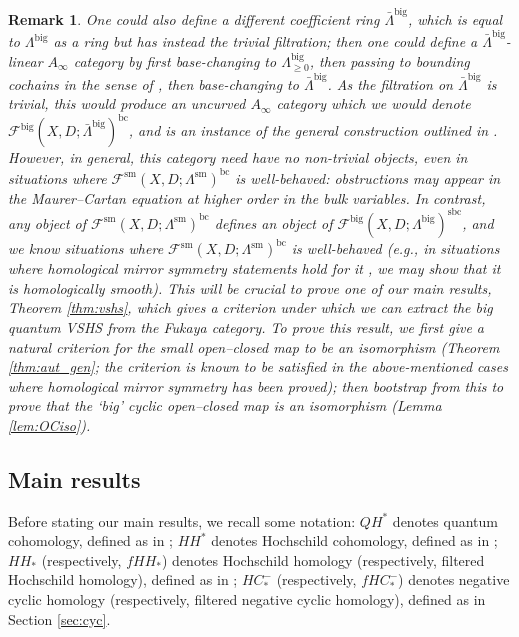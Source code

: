 \documentclass{article}
\newtheorem{rem}[lem]{Remark}
\def\fuk{\EuF}
\def\bc{\mathsf{bc}}
\def\fuk{\mathcal{F}}
\def\bc{{\operatorname{bc}}}
\def\big{{\operatorname{big}}}
\def\sm{{\operatorname{sm}}}
\def\sbc{{\operatorname{sbc}}}
\begin{document}
\begin{rem}
    One could also define a different coefficient ring $\bar\Lambda^\big$, which is equal to $\Lambda^\big$ as a ring but has instead the trivial filtration; then one could define a $\bar\Lambda^\big$-linear $A_\infty$ category by first base-changing to $\Lambda^\big_{\ge 0}$, then passing to bounding cochains in the sense of \cite[Definition 2.15]{relfukii}, then base-changing to $\bar\Lambda^\big$. 
    As the filtration on $\bar\Lambda^\big$ is trivial, this would produce an uncurved $A_\infty$ category which we would denote $\fuk^\big(X,D;\bar\Lambda^\big)^\bc$, and is an instance of the general construction outlined in \cite[Section 1.3]{relfukii}. 
    However, in general, this category need have no non-trivial objects, even in situations where $\fuk^\sm(X,D;\Lambda^\sm)^\bc$ is well-behaved: obstructions may appear in the Maurer--Cartan equation at higher order in the bulk variables. 
    In contrast, any object of $\fuk^\sm(X,D;\Lambda^\sm)^\bc$ defines an object of $\fuk^\big(X,D;\Lambda^\big)^\sbc$, and we know situations where $\fuk^\sm(X,D;\Lambda^\sm)^\bc$ is well-behaved (e.g., in situations where homological mirror symmetry statements hold for it \cite{sheridan2015homological,sheridan2021homological,Ganatra2023integrality,GHHPS}, we may show that it is homologically smooth). 
    This will be crucial to prove one of our main results, Theorem \ref{thm:vshs}, which gives a criterion under which we can extract the big quantum VSHS from the Fukaya category. 
    To prove this result, we first give a natural criterion for the small open--closed map to be an isomorphism (Theorem \ref{thm:aut_gen}; the criterion is known to be satisfied in the above-mentioned cases where homological mirror symmetry has been proved); then bootstrap from this to prove that the `big' cyclic open--closed map is an isomorphism (Lemma \ref{lem:OCiso}). 
\end{rem}

\subsection{Main results}

Before stating our main results, we recall some notation: $QH^*$ denotes quantum cohomology, defined as in \cite[Section 4.1]{relfukii}; $HH^*$ denotes Hochschild cohomology, defined as in \cite[Section 2.7]{relfukii}; $HH_*$ (respectively, $fHH_*$) denotes Hochschild homology (respectively, filtered Hochschild homology), defined as in \cite[Section 2.8]{relfukii}; $HC_*^-$ (respectively, $fHC_*^-$) denotes negative cyclic homology (respectively, filtered negative cyclic homology), defined as in Section \ref{sec:cyc}.
\end{document}
